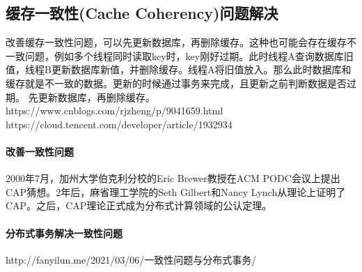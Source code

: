 \documentclass[../../../interview-questions.tex]{subfiles}
\begin{document}
\subsection{缓存一致性(Cache Coherency)问题解决}

改善缓存一致性问题，可以先更新数据库，再删除缓存。这种也可能会存在缓存不一致问题，例如多个线程同时读取key时，key刚好过期。此时线程A查询数据库旧值，线程B更新数据库新值，并删除缓存。线程A将旧值放入。那么此时数据库和缓存就是不一致的数据。更新的时候通过事务来完成，且更新之前判断数据是否过期。
先更新数据库，再删除缓存。https://www.cnblogs.com/rjzheng/p/9041659.html
https://cloud.tencent.com/developer/article/1932934

\paragraph{改善一致性问题}

2000年7月，加州大学伯克利分校的Eric Brewer教授在ACM PODC会议上提出CAP猜想。2年后，麻省理工学院的Seth Gilbert和Nancy Lynch从理论上证明了CAP。之后，CAP理论正式成为分布式计算领域的公认定理。

\paragraph{分布式事务解决一致性问题}

http://fanyilun.me/2021/03/06/一致性问题与分布式事务/
\end{document}
